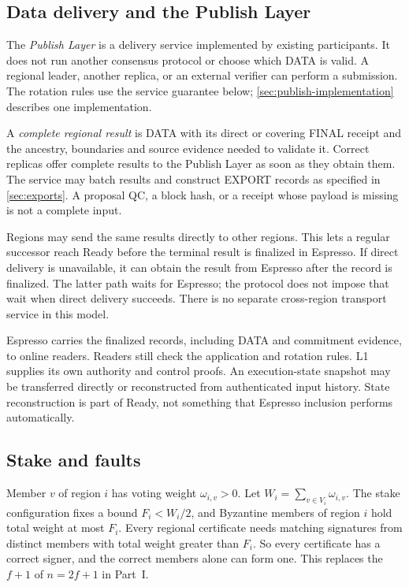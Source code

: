\documentclass[11pt,a4paper]{article}
\newcommand{\defterm}[1]{\textcolor{rrBlue}{\textit{#1}}}
\newcounter{protocol}
\begin{document}
\subsection{Data delivery and the Publish Layer}
\label{sec:delivery}
The \defterm{Publish Layer} is a delivery service implemented by existing
participants. It does not run another consensus protocol or choose which
DATA is valid. A regional leader, another replica, or an external verifier
can perform a submission. The rotation rules use the service guarantee
below; \cref{sec:publish-implementation} describes one implementation.

A \defterm{complete regional result} is DATA with its direct or covering
FINAL receipt and the ancestry, boundaries and source evidence needed to
validate it. Correct replicas offer complete results to the Publish Layer
as soon as they obtain them. The service may batch results and construct
EXPORT records as specified in \cref{sec:exports}. A proposal QC, a block
hash, or a receipt whose payload is missing is not a complete input.

Regions may send the same results directly to other regions. This lets a
regular successor reach Ready before the terminal result is finalized in
Espresso. If direct delivery is unavailable, it can obtain the result from
Espresso after the record is finalized. The latter path waits for Espresso; the
protocol does not impose that wait when direct delivery succeeds.
There is no separate cross-region transport service in this model.

Espresso carries the finalized records, including DATA and commitment
evidence, to online readers. Readers still check the application and
rotation rules. L1 supplies its own authority and control proofs.
An execution-state snapshot may be transferred directly or reconstructed
from authenticated input history. State reconstruction is part of Ready,
not something that Espresso inclusion performs automatically.

\subsection{Stake and faults}
\label{sec:stake}
Member $v$ of region $i$ has voting weight $\omega_{i,v}>0$. Let
$W_i=\sum_{v\in V_i}\omega_{i,v}$. The stake configuration
fixes a bound $F_i<W_i/2$, and Byzantine members of region $i$ hold
total weight at most $F_i$. Every regional certificate needs
matching signatures from distinct members with total weight greater than
$F_i$. So every certificate has a correct signer, and the correct members
alone can form one. This replaces the $f+1$ of $n=2f+1$ in Part~I.
\end{document}
